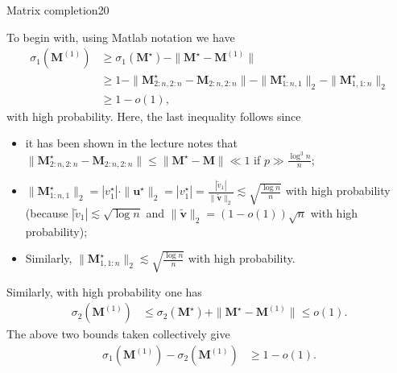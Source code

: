 \documentclass{article}
\begin{document}
\begin{problem}{Matrix completion}{20}
{To begin with, using Matlab notation we have
\begin{align*}
\sigma_{1}( {\bm{M}}^{(1)}) & \geq\sigma_{1}(\bm{M}^\star)-\|\bm{M}^\star- {\bm{M}}^{(1)}\|\\
 & \geq1-\|\bm{M}^\star_{2:n,2:n}- {\bm{M}}_{2:n,2:n}\|-\|\bm{M}^\star_{1:n,1}\|_{2}-\|\bm{M}^\star_{1,1:n}\|_{2}\\
 & \geq1-o(1),
\end{align*}
with high probability. Here, the last inequality follows since 
\begin{itemize}
\item it has been shown in the lecture notes that $\|\bm{M}^\star_{2:n,2:n}- {\bm{M}}_{2:n,2:n}\| \leq \|\bm{M}^\star- {\bm{M}} \| \ll1$
if $p\gg\frac{\log^{3}n}{n}$; 
\item $\|\bm{M}^\star_{1:n,1}\|_{2}=|v^\star_{1}|\cdot\|\bm{u}^\star\|_{2}=|v^\star_{1}|=\frac{|\tilde{v}_{1}|}{\|\tilde{\bm{v}}\|_{2}}\lesssim\sqrt{\frac{\log n}{n}}$
with high probability (because $|\tilde{v}_{1}|\lesssim\sqrt{\log n}$
and $\|\tilde{\bm{v}}\|_{2}=(1-o(1))\sqrt{n}$ with high probability);
\item Similarly, $\|\bm{M}^\star_{1,1:n}\|_{2}\lesssim\sqrt{\frac{\log n}{n}}$
with high probability.
\end{itemize}

Similarly, with high probability one has
\begin{align*}
\sigma_{2}( {\bm{M}}^{(1)}) & \leq\sigma_{2}(\bm{M}^\star) + \|\bm{M}^\star- {\bm{M}}^{(1)}\|
  \leq o(1).
\end{align*}
%
The above two bounds taken collectively give
\begin{align*}
  \sigma_{1}( {\bm{M}}^{(1)}) - \sigma_{2}( {\bm{M}}^{(1)}) & \geq 1 - o(1).
\end{align*}
%


}
\end{problem}
\end{document}
